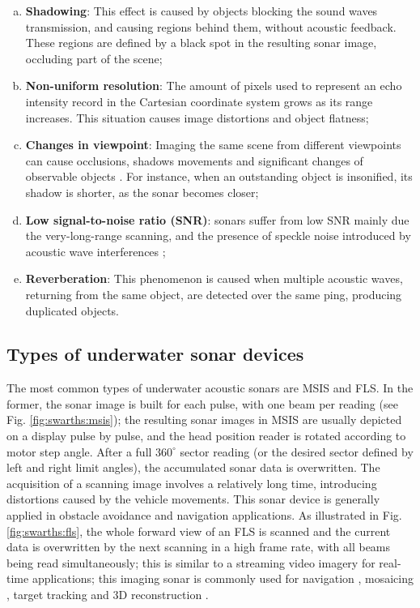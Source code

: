 \documentclass[final,5p,times]{elsarticle}
\begin{document}
\begin{enumerate}[a)]
    \item \textbf{Shadowing}: This effect is caused by objects blocking the
sound waves transmission, and causing regions behind them, without acoustic feedback. These regions are defined by a black spot in the resulting sonar image, occluding part of the scene;
    \item \textbf{Non-uniform resolution}: The amount of pixels used to represent an echo intensity record in the Cartesian coordinate system grows as its range increases. This situation causes image distortions and object flatness;
    \item \textbf{Changes in viewpoint}: Imaging the same scene from different viewpoints can cause occlusions, shadows movements and significant  changes of observable objects \cite{hurtos2014}. For instance, when an    outstanding object is insonified, its shadow is shorter, as the sonar becomes closer;
    \item \textbf{Low signal-to-noise ratio (SNR)}: sonars suffer from low SNR mainly due the very-long-range scanning, and the presence of speckle noise introduced by acoustic wave interferences \cite{abbott1979};
    \item \textbf{Reverberation}: This phenomenon is caused when multiple acoustic waves, returning from the same object, are detected over the same ping, producing duplicated objects.
\end{enumerate}




\subsection{Types of underwater sonar devices}
\label{sonar:devices}

The most common types of underwater acoustic sonars are MSIS and FLS. In
the former, the sonar image is built for each pulse, with one beam per
reading (see Fig. \ref{fig:swarths:msis}); the resulting sonar images in MSIS are usually depicted on a display pulse by pulse, and the head position reader is rotated according to motor step angle. After a full $360^{\circ}$ sector reading (or the desired sector defined by left and right limit angles), the accumulated sonar data is overwritten. The acquisition of a scanning image involves a relatively long time, introducing distortions caused by the vehicle movements. This sonar device is generally applied in obstacle avoidance \cite{ganesan2015} and navigation \cite{ribas2010} applications. As illustrated in Fig. \ref{fig:swarths:fls}, the whole forward view of an FLS is scanned and the current data is overwritten by the next scanning in a high frame rate, with all beams being read simultaneously; this is similar to a streaming video imagery for real-time applications; this imaging sonar is commonly used for navigation \cite{fallon2013}, mosaicing \cite{hurtos2014}, target tracking \cite{liu2016} and 3D reconstruction \cite{huang2015a}.
\end{document}
